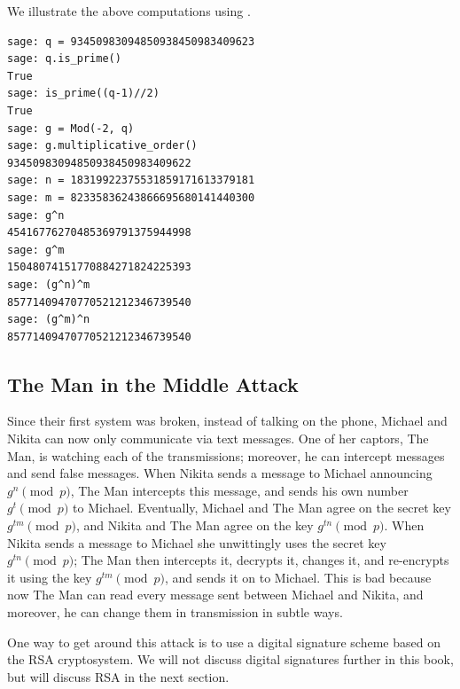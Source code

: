 \begin{sg}
We illustrate the above computations using \sage.
\begin{verbatim}
sage: q = 93450983094850938450983409623
sage: q.is_prime()
True
sage: is_prime((q-1)//2)
True
sage: g = Mod(-2, q)
sage: g.multiplicative_order()
93450983094850938450983409622
sage: n = 18319922375531859171613379181
sage: m = 82335836243866695680141440300
sage: g^n
45416776270485369791375944998
sage: g^m
15048074151770884271824225393
sage: (g^n)^m
85771409470770521212346739540
sage: (g^m)^n
85771409470770521212346739540
\end{verbatim}
\end{sg}

\subsection{The Man in the Middle Attack}
\label{sec:man_in_middle}
\par\noindent{}Since
their first system was broken, instead of talking on the phone,
Michael and Nikita can now only communicate via text messages.  One of
her captors, The Man, is watching each of the
transmissions; moreover, he can intercept messages and send false
messages.  When Nikita sends a message to Michael announcing
$g^n\pmod{p}$, The Man intercepts this message, and sends his own
number $g^t\pmod{p}$ to Michael.  Eventually, Michael and The Man
agree on the secret key $g^{tm}\pmod{p}$, and Nikita and The Man agree
on the key $g^{tn}\pmod{p}$.  When Nikita sends a message to Michael
she unwittingly uses the secret key $g^{tn}\pmod{p}$; The Man then
intercepts it, decrypts it, changes it, and re-encrypts it using the
key $g^{tm}\pmod{p}$, and sends it on to Michael.
This is bad because now The Man can read every message sent between
Michael and Nikita, and moreover, he can change them in transmission
in subtle ways.



One way to get around this attack is to use a digital signature scheme
based on the RSA cryptosystem.  We will not discuss digital signatures
further  in this book, but will discuss RSA in the
next section.


